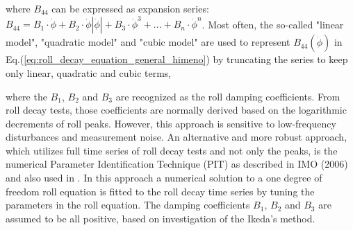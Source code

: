 where $B_{44}$ can be expressed as expansion series:  
$ B_{44} = B_1\cdot\dot{\phi} + B_2\cdot\dot{\phi}\left|\dot{\phi}\right| + B_3\cdot\dot{\phi}^3 + ... + B_n\cdot\dot{\phi}^n$. Most often, the so-called "linear model", "quadratic model" and "cubic model" are used to represent $B_{44}(\dot{\phi})$ in Eq.(\ref{eq:roll_decay_equation_general_himeno}) by truncating the series to keep only linear, quadratic and cubic terms,






where the $B_1$, $B_2$ and $B_3$ are recognized as the roll damping coefficients.
From roll decay tests, those coefficients are normally derived based on the logarithmic decrements of roll peaks. However, this approach is sensitive to low-frequency disturbances and measurement noise. An alternative and more robust approach, which utilizes full time series of roll decay tests and not only the peaks, is the numerical Parameter Identification Technique (PIT) as described in IMO (2006) and also used in \parencite{bulian_simplified_2004}. In this approach a numerical solution to a one degree of freedom roll equation is fitted to the roll decay time series by tuning the parameters in the roll equation. The damping coefficients $B_1$, $B_2$ and $B_3$ are assumed to be all positive, based on investigation of the Ikeda's method.



%